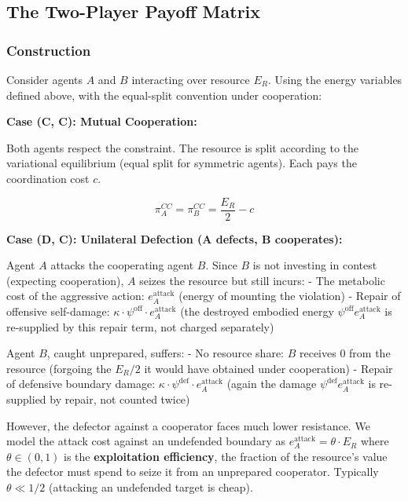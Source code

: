 \documentclass[11pt]{article}
\theoremstyle{plain}
\theoremstyle{definition}
\theoremstyle{remark}
\let\origsubsection\subsection
\renewcommand{\subsection}{\needspace{7\baselineskip}\origsubsection}
\let\origsubsubsection\subsubsection
\renewcommand{\subsubsection}{\needspace{4\baselineskip}\origsubsubsection}
\begin{document}
\subsection{The Two-Player Payoff
Matrix}\label{the-two-player-payoff-matrix}

\subsubsection{Construction}\label{construction}

Consider agents \(A\) and \(B\) interacting over resource \(E_R\). Using
the energy variables defined above, with the equal-split convention
under cooperation:

\textbf{Case (C, C): Mutual Cooperation:}

Both agents respect the constraint. The resource is split according to
the variational equilibrium (equal split for symmetric agents). Each
pays the coordination cost \(c\).

\[\pi_A^{CC} = \pi_B^{CC} = \frac{E_R}{2} - c\]

\textbf{Case (D, C): Unilateral Defection (A defects, B cooperates):}

Agent \(A\) attacks the cooperating agent \(B\). Since \(B\) is not
investing in contest (expecting cooperation), \(A\) seizes the resource
but still incurs: - The metabolic cost of the aggressive action:
\(e_A^{\text{attack}}\) (energy of mounting the violation) - Repair of
offensive self-damage:
\(\kappa \cdot \psi^{\text{off}} \cdot e_A^{\text{attack}}\) (the
destroyed embodied energy \(\psi^{\text{off}} e_A^{\text{attack}}\) is
re-supplied by this repair term, not charged separately)

Agent \(B\), caught unprepared, suffers: - No resource share: \(B\)
receives \(0\) from the resource (forgoing the \(E_R/2\) it would have
obtained under cooperation) - Repair of defensive boundary damage:
\(\kappa \cdot \psi^{\text{def}} \cdot e_A^{\text{attack}}\) (again the
damage \(\psi^{\text{def}} e_A^{\text{attack}}\) is re-supplied by
repair, not counted twice)

However, the defector against a cooperator faces much lower resistance.
We model the attack cost against an undefended boundary as
\(e_A^{\text{attack}} = \theta \cdot E_R\) where \(\theta \in (0, 1)\)
is the \textbf{exploitation efficiency}, the fraction of the resource's
value the defector must spend to seize it from an unprepared cooperator.
Typically \(\theta \ll 1/2\) (attacking an undefended target is cheap).
\end{document}
